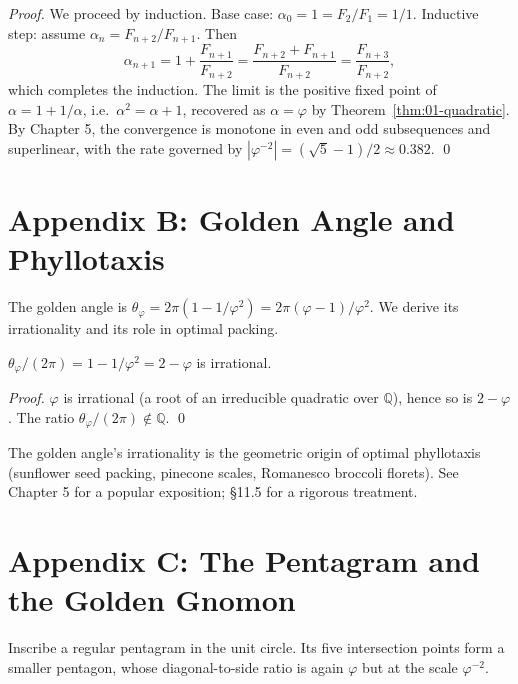 \begin{proof}
We proceed by induction. Base case: $\alpha_0 = 1 = F_2/F_1 = 1/1$.
Inductive step: assume $\alpha_n = F_{n+2}/F_{n+1}$. Then
\[
  \alpha_{n+1} = 1 + \frac{F_{n+1}}{F_{n+2}} = \frac{F_{n+2} +
  F_{n+1}}{F_{n+2}} = \frac{F_{n+3}}{F_{n+2}},
\]
which completes the induction. The limit is the positive fixed point
of $\alpha = 1 + 1/\alpha$, i.e.\ $\alpha^2 = \alpha + 1$, recovered as
$\alpha = \varphi$ by Theorem~\ref{thm:01-quadratic}. By
\cite{koshy_fib_lucas} Chapter 5, the convergence is monotone in even
and odd subsequences and superlinear, with the rate governed by
$|\varphi^{-2}| = (\sqrt 5 - 1)/2 \approx 0.382$.
\qed
\end{proof}

\section*{Appendix B: Golden Angle and Phyllotaxis}
\label{fa_01:sec:01-app-B}

The golden angle is $\theta_\varphi = 2\pi (1 - 1/\varphi^2) = 2\pi
(\varphi - 1)/\varphi^2$. We derive its irrationality and its role in
optimal packing.

\begin{lemma}\label{fa_01:lem:01-golden-angle}
$\theta_\varphi / (2\pi) = 1 - 1/\varphi^2 = 2 - \varphi$ is
irrational.
\end{lemma}

\begin{proof}
$\varphi$ is irrational (a root of an irreducible quadratic over
$\mathbb{Q}$), hence so is $2 - \varphi$. The ratio
$\theta_\varphi / (2 \pi) \notin \mathbb{Q}$.
\qed
\end{proof}

\begin{remark}
The golden angle's irrationality is the geometric origin of optimal
phyllotaxis (sunflower seed packing, pinecone scales, Romanesco
broccoli florets). See \cite{livio_phi} Chapter 5 for a popular
exposition; \cite{coxeter_intro_geometry} \S 11.5 for a rigorous
treatment.
\end{remark}

\section*{Appendix C: The Pentagram and the Golden Gnomon}
\label{fa_01:sec:01-app-C}

Inscribe a regular pentagram in the unit circle. Its five
intersection points form a smaller pentagon, whose diagonal-to-side
ratio is again $\varphi$ but at the scale $\varphi^{-2}$.

